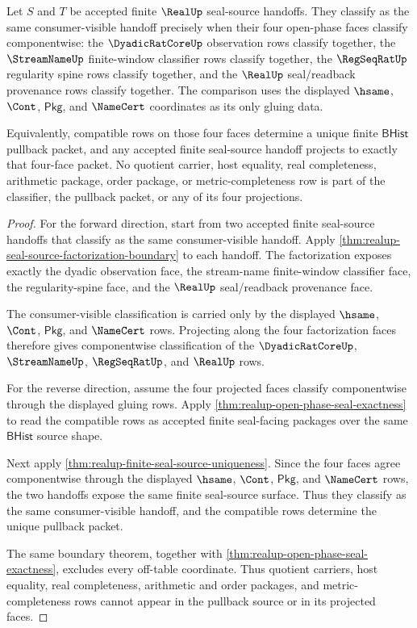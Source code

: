 \begin{theorem}
\label{thm:realup-open-phase-four-face-pullback}
Let $S$ and $T$ be accepted finite $\RealUp$ seal-source handoffs. They classify
as the same consumer-visible handoff precisely when their four open-phase faces
classify componentwise: the $\DyadicRatCoreUp$ observation rows classify
together, the $\StreamNameUp$ finite-window classifier rows classify together,
the $\RegSeqRatUp$ regularity spine rows classify together, and the $\RealUp$
seal/readback provenance rows classify together. The comparison uses the
displayed $\hsame$, $\Cont$, $\mathsf{Pkg}$, and $\NameCert$ coordinates as its
only gluing data.

Equivalently, compatible rows on those four faces determine a unique finite
$\mathsf{BHist}$ pullback packet, and any accepted finite seal-source handoff
projects to exactly that four-face packet. No quotient carrier, host equality,
real completeness, arithmetic package, order package, or metric-completeness row
is part of the classifier, the pullback packet, or any of its four projections.
\end{theorem}
\begin{proof}
For the forward direction, start from two accepted finite seal-source handoffs
that classify as the same consumer-visible handoff. Apply
\autoref{thm:realup-seal-source-factorization-boundary} to each handoff. The
factorization exposes exactly the dyadic observation face, the stream-name
finite-window classifier face, the regularity-spine face, and the $\RealUp$
seal/readback provenance face.

The consumer-visible classification is carried only by the displayed $\hsame$,
$\Cont$, $\mathsf{Pkg}$, and $\NameCert$ rows. Projecting along the four
factorization faces therefore gives componentwise classification of the
$\DyadicRatCoreUp$, $\StreamNameUp$, $\RegSeqRatUp$, and $\RealUp$ rows.

For the reverse direction, assume the four projected faces classify
componentwise through the displayed gluing rows. Apply
\autoref{thm:realup-open-phase-seal-exactness} to read the compatible rows as
accepted finite seal-facing packages over the same $\mathsf{BHist}$ source
shape.

Next apply \autoref{thm:realup-finite-seal-source-uniqueness}. Since the four
faces agree componentwise through the displayed $\hsame$, $\Cont$,
$\mathsf{Pkg}$, and $\NameCert$ rows, the two handoffs expose the same finite
seal-source surface. Thus they classify as the same consumer-visible handoff,
and the compatible rows determine the unique pullback packet.

The same boundary theorem, together with
\autoref{thm:realup-open-phase-seal-exactness}, excludes every off-table
coordinate. Thus quotient carriers, host equality, real completeness,
arithmetic and order packages, and metric-completeness rows cannot appear in
the pullback source or in its projected faces.
\end{proof}

